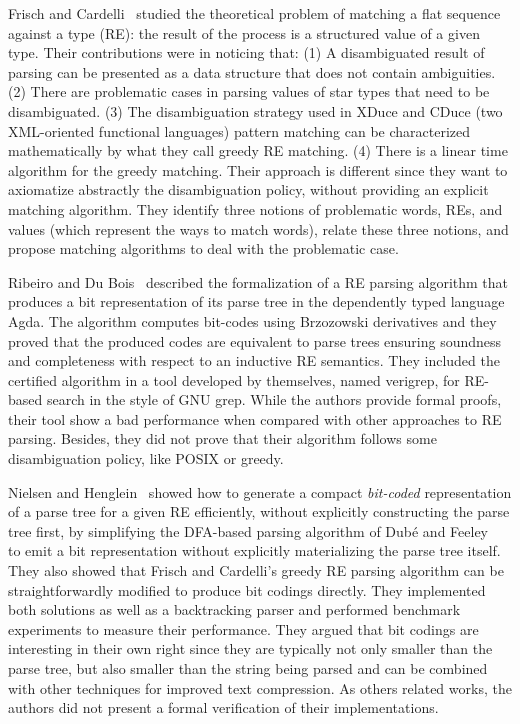 \documentclass[sigplan]{acmart}
\theoremstyle{definition}
\begin{document}
Frisch and Cardelli~\cite{Frisch2004} studied the theoretical problem of matching a flat sequence against a type (RE): the
result of the process is a structured value of a given type. Their contributions were in noticing that: (1) A disambiguated
result of parsing can be presented as a data structure that does not contain ambiguities. (2) There are problematic cases in
parsing values of star types that need to be disambiguated. (3) The disambiguation strategy used in XDuce and CDuce (two
XML-oriented functional languages) pattern matching can be characterized mathematically by what they call greedy RE matching.
(4) There is a linear time algorithm for the greedy matching. Their approach is different since they want to axiomatize abstractly
the disambiguation policy, without providing an explicit matching algorithm. They identify three notions of problematic words, REs,
and values (which represent the ways to match words), relate these three notions, and propose matching algorithms to deal with the
problematic case.

Ribeiro and Du Bois~\cite{Ribeiro2017} described the formalization of a RE parsing algorithm that produces a bit representation
of its parse tree in the dependently typed language Agda. The algorithm computes bit-codes using Brzozowski derivatives and
they proved that the produced codes are equivalent to parse trees ensuring soundness and completeness with respect to an
inductive RE semantics. They included the certified algorithm in a tool developed by themselves, named verigrep, for RE-based
search in the style of GNU grep. While the authors provide formal proofs, their tool show a bad performance when compared with
other approaches to RE parsing. Besides, they did not prove that their algorithm follows some disambiguation policy, like POSIX
or greedy.

Nielsen and Henglein~\cite{Lasse2011} showed how to generate a compact \textit{bit-coded} representation of a parse tree for a
given RE efficiently, without explicitly constructing the parse tree first, by simplifying the DFA-based parsing algorithm of
Dub\'e and Feeley~\cite{Dube2000} to emit a bit representation without explicitly materializing the parse tree itself.
They also showed that Frisch and Cardelli’s greedy RE parsing algorithm \cite{Frisch2004} can be straightforwardly modified to
produce bit codings directly. They implemented both solutions as well as a backtracking parser and performed benchmark experiments
to measure their performance. They argued that bit codings are interesting in their own right since they are typically not
only smaller than the parse tree, but also smaller than the string being parsed and can be combined with other techniques for
improved text compression. As others related works, the authors did not present a formal verification of their implementations.
\end{document}
